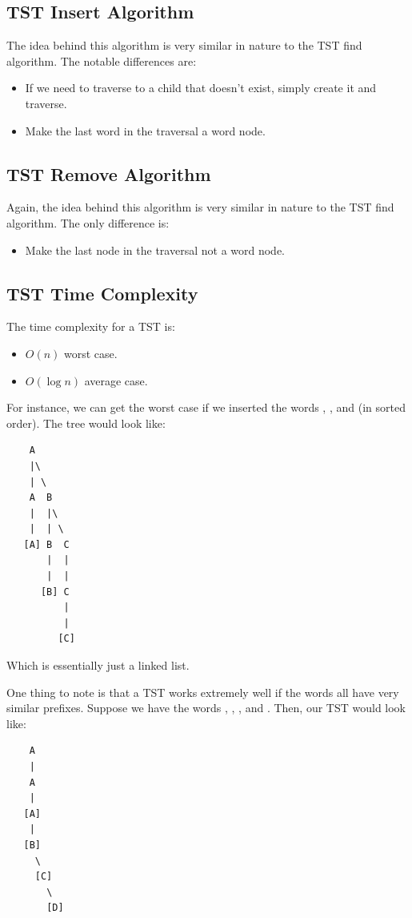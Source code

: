 \documentclass[letterpaper]{article}
\begin{document}
\subsection{TST Insert Algorithm}
The idea behind this algorithm is very similar in nature to the TST find algorithm. The notable differences are: 
\begin{itemize}
    \item If we need to traverse to a child that doesn't exist, simply create it and traverse. 
    \item Make the last word in the traversal a word node. 
\end{itemize}

\subsection{TST Remove Algorithm}
Again, the idea behind this algorithm is very similar in nature to the TST find algorithm. The only difference is: 
\begin{itemize}
    \item Make the last node in the traversal not a word node. 
\end{itemize}

\subsection{TST Time Complexity}
The time complexity for a TST is: 
\begin{itemize}
    \item $O(n)$ worst case.
    \item $O(\log n)$ average case. 
\end{itemize}
For instance, we can get the worst case if we inserted the words , , and  (in sorted order). The tree would look like: 
\begin{verbatim}
    A
    |\ 
    | \  
    A  B 
    |  |\ 
    |  | \ 
   [A] B  C
       |  |
       |  |
      [B] C
          |
          |
         [C]
\end{verbatim}
Which is essentially just a linked list. 

\bigskip

One thing to note is that a TST works extremely well if the words all have very similar prefixes. Suppose we have the words , , , and . Then, our TST would look like: 
\begin{verbatim}
    A
    |
    A
    |
   [A]
    |
   [B]
     \ 
     [C] 
       \ 
       [D] 
\end{verbatim}
\end{document}
